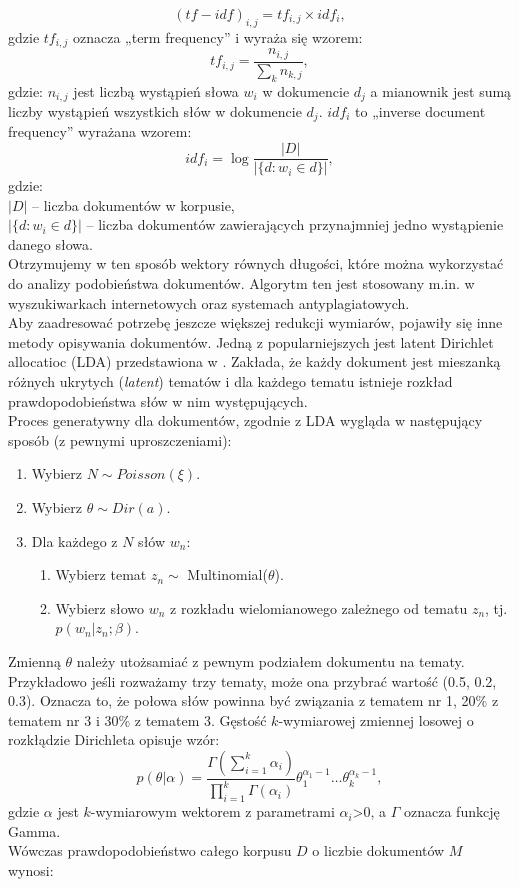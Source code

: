 \documentclass[a4paper,11pt,twoside]{report}
\theoremstyle{definition}
\begin{document}
\begin{equation} 
(tf -idf)_{i,j} =tf_{i,j} \times idf_{i},
\end{equation}
gdzie $tf_{i, j}$ oznacza „term frequency” i wyraża się wzorem:
\begin{equation}
tf_{i,j} =\frac {n_{i,j}}{\sum _{k}n_{k,j}},
\end{equation}
gdzie: $n_{i,j}$ jest liczbą wystąpień słowa $w_{i}$ w dokumencie $d_{j}$ a mianownik jest sumą liczby wystąpień wszystkich słów w dokumencie $d_{j}$. $idf_{i}$ to „inverse document frequency” wyrażana wzorem:
\begin{equation}
idf_{i} =\log \frac {|D|}{|\{d:w_{i}\in d\}|},
\end{equation}
gdzie: \\
$|D|$ – liczba dokumentów w korpusie,\\
$|\{d:w_{i}\in d\}|$ – liczba dokumentów zawierających przynajmniej jedno wystąpienie danego słowa.\\
Otrzymujemy w ten sposób wektory równych długości, które można wykorzystać do analizy podobieństwa dokumentów. Algorytm ten jest stosowany m.in. w wyszukiwarkach internetowych oraz systemach antyplagiatowych. \\
Aby zaadresować potrzebę jeszcze większej redukcji wymiarów, pojawiły się inne metody opisywania dokumentów. Jedną z popularniejszych jest latent Dirichlet allocatioc (LDA) przedstawiona w \cite{LDA}. Zakłada, że każdy dokument jest mieszanką różnych ukrytych (\textit{latent}) tematów i dla każdego tematu istnieje rozkład prawdopodobieństwa słów w nim występujących.\\
Proces generatywny dla dokumentów, zgodnie z LDA wygląda w następujący sposób (z pewnymi uproszczeniami):
\begin{enumerate}
\item Wybierz $N \sim Poisson(\xi)$.
\item Wybierz $\theta \sim Dir(a)$.
\item Dla każdego z $N$ słów $w_n$:
\begin{enumerate}
	\item Wybierz temat $z_n \sim$  Multinomial($\theta$).
	\item Wybierz słowo $w_n$ z rozkładu wielomianowego zależnego od tematu $z_n$, tj. $p(w_n|z_n;\beta)$.
\end{enumerate} \end{enumerate}
Zmienną $\theta$ należy utożsamiać z pewnym podziałem dokumentu na tematy. Przykładowo jeśli rozważamy trzy tematy, może ona przybrać wartość (0.5, 0.2, 0.3). Oznacza to, że połowa słów powinna być związania z tematem nr 1, 20\% z tematem nr 3 i 30\% z tematem 3. Gęstość $k$-wymiarowej zmiennej losowej o rozkłądzie Dirichleta opisuje wzór:
\begin{equation}
p(\theta|\alpha) = \frac {\Gamma (\sum_{i=1}^{k}\alpha_i)} {\prod_{i=1}^{k}\Gamma(\alpha_i)} \theta_1^{\alpha_1 -1} \dots \theta_k^{\alpha_k -1},
\end{equation}
gdzie $\alpha$ jest $k$-wymiarowym wektorem z parametrami $\alpha_i$>0, a $\Gamma$ oznacza funkcję Gamma.\\
Wówczas prawdopodobieństwo całego korpusu $D$ o liczbie dokumentów $M$ wynosi:
\end{document}
